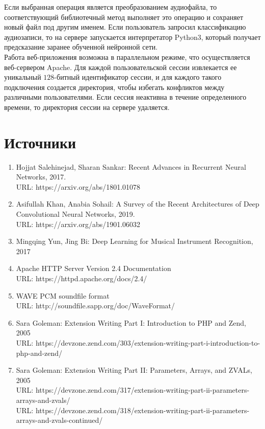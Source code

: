 \documentclass[14pt,a4paper]{article}
\begin{document}
Если выбранная операция является преобразованием аудиофайла, то соответствующий библиотечный метод выполняет это операцию и сохраняет новый файл под другим именем. Если пользователь запросил классификацию аудиозаписи, то на сервере запускается интерпретатор Python3, который получает предсказание заранее обученной нейронной сети. \\

Работа веб-приложения возможна в параллельном режиме, что осуществляется веб-сервером Apache. Для каждой пользовательской сессии извлекается ее уникальный $128$-битный идентификатор сессии, и для каждого такого подключения создается директория, чтобы избегать конфликтов между различными пользователями. Если сессия неактивна в течение определенного времени, то директория сессии на сервере удаляется.

\newpage

\section[Источники]{\huge Источники}

\begin{enumerate}
\item Hojjat Salehinejad, Sharan Sankar: Recent Advances in Recurrent Neural Networks, 2017. \\
URL: https://arxiv.org/abs/1801.01078
\item Asifullah Khan, Anabia Sohail: A Survey of the Recent Architectures of Deep Convolutional Neural Networks, 2019. \\
URL: https://arxiv.org/abs/1901.06032
\item Mingqing Yun, Jing Bi: Deep Learning for Musical Instrument Recognition, 2017
\item Apache HTTP Server Version 2.4 Documentation \\
URL: https://httpd.apache.org/docs/2.4/
\item WAVE PCM soundfile format \\
URL: http://soundfile.sapp.org/doc/WaveFormat/
\item Sara Goleman: Extension Writing Part I: Introduction to PHP and Zend, 2005 \\
URL: https://devzone.zend.com/303/extension-writing-part-i-introduction-to-php-and-zend/
\item Sara Goleman: Extension Writing Part II: Parameters, Arrays, and ZVALs, 2005 \\
URL: https://devzone.zend.com/317/extension-writing-part-ii-parameters-arrays-and-zvals/ \\
URL: https://devzone.zend.com/318/extension-writing-part-ii-parameters-arrays-and-zvals-continued/
\end{enumerate}
\end{document}

